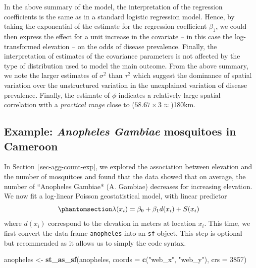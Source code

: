 \documentclass[
  letterpaper,
]{krantz}
\newenvironment{Shaded}{\begin{snugshade}}{\end{snugshade}}
\newcommand{\AttributeTok}[1]{\textcolor[rgb]{0.13,0.29,0.53}{#1}}
\newcommand{\DecValTok}[1]{\textcolor[rgb]{0.00,0.00,0.81}{#1}}
\newcommand{\FunctionTok}[1]{\textcolor[rgb]{0.13,0.29,0.53}{\textbf{#1}}}
\newcommand{\NormalTok}[1]{#1}
\newcommand{\OtherTok}[1]{\textcolor[rgb]{0.56,0.35,0.01}{#1}}
\newcommand{\StringTok}[1]{\textcolor[rgb]{0.31,0.60,0.02}{#1}}
\begin{document}
In the above summary of the model, the interpretation of the regression
coefficients is the same as in a standard logistic regression model.
Hence, by taking the exponential of the estimate for the regression
coefficient \(\beta_1\), we could then express the effect for a unit
increase in the covariate -- in this case the log-transformed elevation
-- on the odds of disease prevalence. Finally, the interpretation of
estimates of the covariance parameters is not affected by the type of
distribution used to model the main outcome. From the above summary, we
note the larger estimates of \(\sigma^2\) than \(\tau^2\) which suggest
the dominance of spatial variation over the unstructured variation in
the unexplained variation of disease prevalence. Finally, the estimate
of \(\phi\) indicates a relatively large spatial correlation with a
\emph{practical range} close to (\(58.67 \times 3 \approx\))180km.

\subsection{\texorpdfstring{Example: \emph{Anopheles Gambiae} mosquitoes
in
Cameroon}{Example: Anopheles Gambiae mosquitoes in Cameroon}}\label{sec-anopheles-fit}

In Section~\ref{sec-agg-count-exp}, we explored the association between
elevation and the number of mosquitoes and found that the data showed
that on average, the number of ``Anopheles Gambiae* (A. Gambiae)
decreases for increasing elevation. We now fit a log-linear Poisson
geostatistical model, with linear predictor
\begin{equation}\phantomsection\label{eq-anopheles}{
\lambda(x_i) = \beta_0 + \beta_1 d(x_i) + S(x_i)
}\end{equation} where \(d(x_i)\) correspond to the elevation in meters
at location \(x_i\). This time, we first convert the data frame
\texttt{anopheles} into an \texttt{sf} object. This step is optional but
recommended as it allows us to simply the code syntax.

\begin{Shaded}
\begin{Highlighting}[]
\NormalTok{anopheles }\OtherTok{\textless{}{-}} \FunctionTok{st\_as\_sf}\NormalTok{(anopheles, }\AttributeTok{coords =} \FunctionTok{c}\NormalTok{(}\StringTok{"web\_x"}\NormalTok{, }\StringTok{"web\_y"}\NormalTok{),}
                      \AttributeTok{crs =} \DecValTok{3857}\NormalTok{)}
\end{Highlighting}
\end{Shaded}
\end{document}
